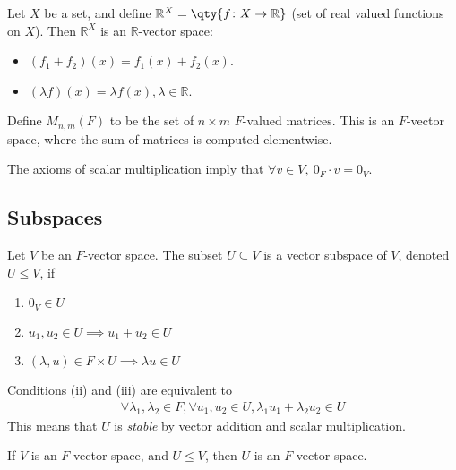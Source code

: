 \begin{example}
    Let $X$ be a set, and define $\mathbb R^X = \qty{ f \colon X \to \mathbb R}$ (set of real valued functions on $X$).
    Then $\mathbb R^X$ is an $\mathbb R$-vector space:
    \begin{itemize}
        \item $(f_1 + f_2)(x) = f_1(x) + f_2(x)$.
        \item $(\lambda f)(x) = \lambda f(x), \lambda \in \mathbb{R}$.
    \end{itemize} 
\end{example}

\begin{example}
    Define $M_{n,m}(F)$ to be the set of $n \times m$ $F$-valued matrices.
    This is an $F$-vector space, where the sum of matrices is computed elementwise.
\end{example}

\begin{remark}
    The axioms of scalar multiplication imply that $\forall v \in V,\ 0_F \cdot v = 0_V$.
\end{remark}

\subsection{Subspaces}
\begin{definition}[Subspace]
    Let $V$ be an $F$-vector space.
    The subset $U \subseteq V$ is a vector subspace of $V$, denoted $U \leq V$, if
    \begin{enumerate}
        \item $0_V \in U$
        \item $u_1, u_2 \in U \implies u_1 + u_2 \in U$
        \item $(\lambda, u) \in F \times U \implies \lambda u \in U$
    \end{enumerate}
    Conditions (ii) and (iii) are equivalent to
    \begin{align*}
        \forall \lambda_1, \lambda_2 \in F, \forall u_1, u_2 \in U, \lambda_1 u_1 + \lambda_2 u_2 \in U
    \end{align*}
    This means that $U$ is \textit{stable} by vector addition and scalar multiplication.
\end{definition}

\begin{proposition}
    If $V$ is an $F$-vector space, and $U \leq V$, then $U$ is an $F$-vector space.
\end{proposition}

